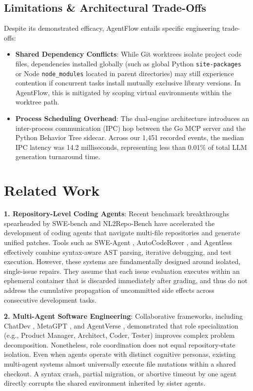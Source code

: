 \documentclass[conference]{IEEEtran}
\begin{document}
\subsection{Limitations \& Architectural Trade-Offs}
Despite its demonstrated efficacy, AgentFlow entails specific engineering trade-offs:
\begin{itemize}
    \item \textbf{Shared Dependency Conflicts}: While Git worktrees isolate project code files, dependencies installed globally (such as global Python \texttt{site-packages} or Node \texttt{node\_modules} located in parent directories) may still experience contention if concurrent tasks install mutually exclusive library versions. In AgentFlow, this is mitigated by scoping virtual environments within the worktree path.
    \item \textbf{Process Scheduling Overhead}: The dual-engine architecture introduces an inter-process communication (IPC) hop between the Go MCP server and the Python Behavior Tree sidecar. Across our 1,451 recorded events, the median IPC latency was 14.2 milliseconds, representing less than 0.01\% of total LLM generation turnaround time.
\end{itemize}

\section{Related Work}
\label{sec:related}

\textbf{1. Repository-Level Coding Agents}: Recent benchmark breakthroughs spearheaded by SWE-bench \cite{jimenez2023swebench} and NL2Repo-Bench \cite{hou2024large} have accelerated the development of coding agents that navigate multi-file repositories and generate unified patches. Tools such as SWE-Agent \cite{yang2024sweagent}, AutoCodeRover \cite{zhang2024autocoderover}, and Agentless \cite{xia2024agentless} effectively combine syntax-aware AST parsing, iterative debugging, and test execution. However, these systems are fundamentally designed around isolated, single-issue repairs. They assume that each issue evaluation executes within an ephemeral container that is discarded immediately after grading, and thus do not address the cumulative propagation of uncommitted side effects across consecutive development tasks.

\textbf{2. Multi-Agent Software Engineering}: Collaborative frameworks, including ChatDev \cite{qian2023communicative}, MetaGPT \cite{hong2023metagpt}, and AgentVerse \cite{chen2023agentverse}, demonstrated that role specialization (e.g., Product Manager, Architect, Coder, Tester) improves complex problem decomposition. Nonetheless, role coordination does not equal repository-state isolation. Even when agents operate with distinct cognitive personas, existing multi-agent systems almost universally execute file mutations within a shared checkout. A syntax crash, partial migration, or abortive timeout by one agent directly corrupts the shared environment inherited by sister agents.
\end{document}
